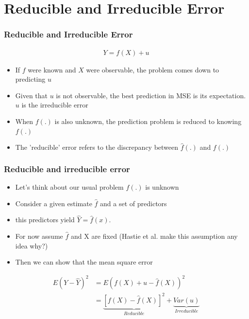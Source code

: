 \documentclass[
  shownotes,
  xcolor={svgnames},
  hyperref={colorlinks,citecolor=DarkBlue,linkcolor=DarkRed,urlcolor=DarkBlue}
  ]{beamer}
\begin{document}
\section{Reducible and Irreducible Error}
\begin{frame}
\frametitle{Reducible and Irreducible Error}



\begin{align}
  Y=f(X)+u
\end{align}


\begin{itemize}
    \item  If $f$ were known and $X$ were observable, the problem comes down to predicting $u$
    \item  Given that $u$ is not observable, the best prediction in MSE is its expectation. $u$ is the irreducible error
    \item  When $f(.)$ is also unknown, the prediction problem is reduced to knowing $f(.)$
    \item  The 'reducible' error refers to the discrepancy between   $\hat f(.)$ and $f(.)$

\end{itemize}

\end{frame}
\begin{frame}
\frametitle{Reducible and irreducible error}

\begin{itemize}
\item Let's think about our usual problem $f(.)$ is unknown
\item Consider a given estimate $\hat f$ and a set of predictors
\item this predictors yield $\hat Y = \hat f(x)$.
\item For now assume $\hat f$ and X are fixed {\tiny (Hastie et al. make this assumption any idea why?)}
\item Then we can show that the mean square error
\end{itemize}

\begin{align}
E(Y-\hat Y)^2 &= E(f(X)+u - \hat f(X))^2 \\
      &= \underset{Reducible}{\underbrace{[f(X)-\hat{f}(X)]^{2}}}+\underset{Irreducible}{\underbrace{Var(u)}}
\end{align}

\end{frame}
\end{document}
